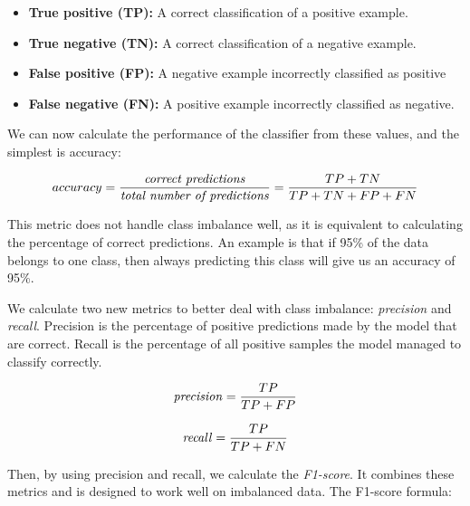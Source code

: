         \begin{itemize}
            \item \textbf{True positive (TP):} A correct classification of a positive example.
            \item \textbf{True negative (TN):} A correct classification of a negative example.
            \item \textbf{False positive (FP):} A negative example incorrectly classified as positive
            \item \textbf{False negative (FN):} A positive example incorrectly classified as negative.
            \end{itemize}
        
        We can now calculate the performance of the classifier from these values, and the simplest is accuracy\cite{powers2020evaluation_f1_recall_precision}:
        
        \begin{equation}
            accuracy = \dfrac{\textrm{\textit{correct predictions}}}{\textrm{\textit{total number of predictions}}} = \dfrac{TP+TN}{TP+TN+FP+FN} 
        \end{equation}
        
        This metric does not handle class imbalance well, as it is equivalent to calculating the percentage of correct predictions\cite{powers2020evaluation_f1_recall_precision}. An example is that if 95\% of the data belongs to one class, then always predicting this class will give us an accuracy of 95\%.
        
        We calculate two new metrics to better deal with class imbalance:  \textit{precision} and \textit{recall}\cite{powers2020evaluation_f1_recall_precision}. Precision is the percentage of positive predictions made by the model that are correct. Recall is the percentage of all positive samples the model managed to classify correctly.
        
        \begin{equation}
            \textrm{\textit{precision}} = \dfrac{TP}{TP+FP}
        \end{equation}
        
        \begin{equation}
            \textrm{\textit{recall}} = \dfrac{TP}{TP+FN}
        \end{equation}
        
        Then, by using precision and recall, we calculate the \textit{F1-score}\cite{powers2020evaluation_f1_recall_precision}. It combines these metrics and is designed to work well on imbalanced data. The F1-score formula: %
        
